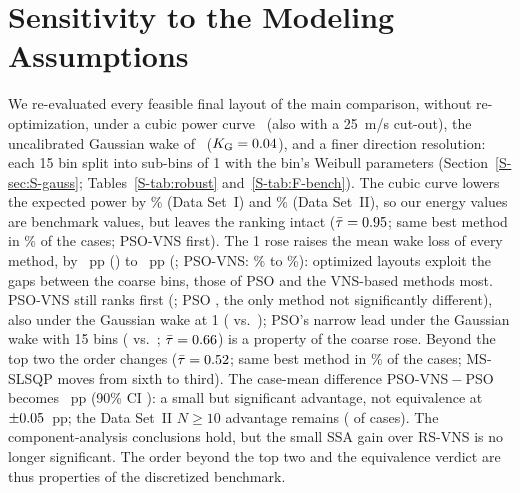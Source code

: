 \section{Sensitivity to the Modeling Assumptions}
\label{sec:robustness}
\label{sec:powercurve}
\label{sec:gaussian}
We re-evaluated every feasible final layout of the main comparison, without re-optimization, under a cubic power curve~\cite{Carrillo2013} (also with a 25~m/s cut-out), the uncalibrated Gaussian wake of~\cite{Bastankhah2014} ($K_{\rm G}=0.04$), and a finer direction resolution: each 15\textdegree{} bin split into \NFSubBins{} sub-bins of 1\textdegree{} with the bin's Weibull parameters (Section~\ref{S-sec:S-gauss}; Tables~\ref{S-tab:robust} and~\ref{S-tab:F-bench}). The cubic curve lowers the expected power by \NCubicOverI\% (Data Set~I) and \NCubicOverII\% (Data Set~II), so our energy values are benchmark values, but leaves the ranking intact ($\bar\tau=0.95$; same best method in \NSameCubic\% of the cases; PSO-VNS first).
The 1\textdegree{} rose raises the mean wake loss of every method, by \NFLossRiseMin~pp (\NFLossRiseMinBy) to \NFLossRiseMax~pp (\NFLossRiseMaxBy; PSO-VNS: \NFLossPSOVNSFifteen\% to \NFLossPSOVNSOne\%): optimized layouts exploit the gaps between the coarse bins, those of PSO and the VNS-based methods most. PSO-VNS still ranks first (\NFRankPSOVNSOne; PSO \NFRankPSOOne, the only method not significantly different), also under the Gaussian wake at 1\textdegree{} (\NFGaussOneRankPSOVNS{} vs.\ \NFGaussOneRankPSO); PSO's narrow lead under the Gaussian wake with 15\textdegree{} bins (\NFGaussFifteenRankPSO{} vs.\ \NFGaussFifteenRankPSOVNS; $\bar\tau=0.66$) is a property of the coarse rose. Beyond the top two the order changes ($\bar\tau=0.52$; same best method in \NFSameBestOne\% of the cases; MS-SLSQP moves from sixth to third). The case-mean difference PSO-VNS${}-{}$PSO becomes \NFPairMeanOne~pp (90\% CI \NFPairCIOne): a small but significant advantage, not equivalence at $\pm0.05$~pp; the Data Set~II $N\ge10$ advantage remains (\NFDSIINTenWinsOne{} of \NFDSIINTenN{} cases). The component-analysis conclusions hold, but the small SSA gain over RS-VNS is no longer significant. The order beyond the top two and the equivalence verdict are thus properties of the discretized benchmark.

